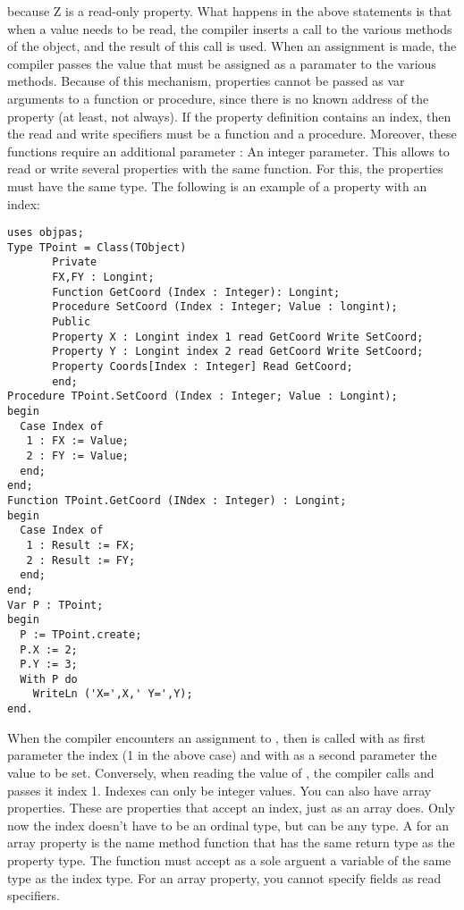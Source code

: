 \documentclass{report}
\begin{document}
because Z is a read-only property.
What happens in the above statements is that when a value needs to be read,
the compiler inserts a call to the various  methods of the
object, and the result of this call is used. When an assignment is made,
the compiler passes the value that must be assigned as a paramater to
the various  methods.
Because of this mechanism, properties cannot be passed as var arguments to a
function or procedure, since there is no known address of the property (at
least, not always).
If the property definition contains an index, then the read and write
specifiers must be a function and a procedure. Moreover, these functions
require an additional parameter : An integer parameter. This allows to read
or write several properties with the same function. For this, the properties
must have the same type.
The following is an example of a property with an index:
\begin{verbatim}
uses objpas;
Type TPoint = Class(TObject)
       Private
       FX,FY : Longint;
       Function GetCoord (Index : Integer): Longint;
       Procedure SetCoord (Index : Integer; Value : longint);
       Public
       Property X : Longint index 1 read GetCoord Write SetCoord;
       Property Y : Longint index 2 read GetCoord Write SetCoord;
       Property Coords[Index : Integer] Read GetCoord;
       end;
Procedure TPoint.SetCoord (Index : Integer; Value : Longint);
begin
  Case Index of
   1 : FX := Value;
   2 : FY := Value;
  end;
end;
Function TPoint.GetCoord (INdex : Integer) : Longint;
begin
  Case Index of
   1 : Result := FX;
   2 : Result := FY;
  end;
end;
Var P : TPoint;
begin
  P := TPoint.create;
  P.X := 2;
  P.Y := 3;
  With P do
    WriteLn ('X=',X,' Y=',Y);
end.
\end{verbatim}
When the compiler encounters an assignment to , then 
is called with as first parameter the index (1 in the above case) and with
as a second parameter the value to be set.
Conversely, when reading the value of , the compiler calls
 and passes it index 1.
Indexes can only be integer values.
You can also have array properties. These are properties that accept an
index, just as an array does. Only now the index doesn't have to be an
ordinal type, but can be any type.
A  for an array property is the name method function
that has the same return type as  the property type.
The function must accept as a sole arguent a variable of the same type as
the index type. For an array property, you cannot specify fields as read
specifiers.
\end{document}
